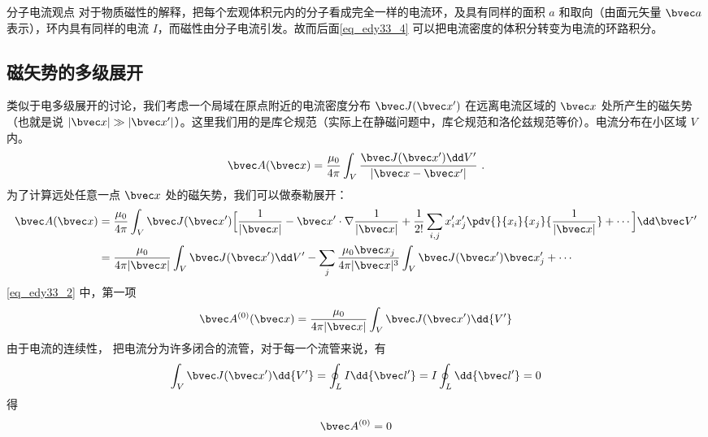
\begin{lemma}{分子电流观点}
对于物质磁性的解释，把每个宏观体积元内的分子看成完全一样的电流环，及具有同样的面积 $a$ 和取向（由面元矢量 $\bvec a$ 表示），环内具有同样的电流 $I$，而磁性由分子电流引发。故而后面\autoref{eq_edy33_4} 可以把电流密度的体积分转变为电流的环路积分。
\end{lemma}
\subsection{磁矢势的多级展开}
类似于电多级展开的讨论，我们考虑一个局域在原点附近的电流密度分布 $\bvec J(\bvec x')$ 在远离电流区域的 $\bvec x$ 处所产生的磁矢势（也就是说 $|\bvec x|\gg|\bvec x'|$）。这里我们用的是库仑规范（实际上在静磁问题中，库仑规范和洛伦兹规范等价）。电流分布在小区域 $V$ 内。
\begin{equation}
\bvec A(\bvec x)=\dfrac {\mu_0}{4\pi} \int_V \dfrac{ \bvec J(\bvec x^{\prime})\dd V^{\prime}}{|\bvec x - \bvec x'|}\label{eq_edy33_1}~.
\end{equation}
为了计算远处任意一点 $\bvec x$ 处的磁矢势，我们可以做泰勒展开：
\begin{equation}\label{eq_edy33_2}
\begin{aligned}
\bvec A(\bvec x)&=\dfrac {\mu_0}{4\pi}\int_V \bvec J(\bvec x')\Big[\dfrac{1}{|\bvec x|}-\bvec x'\cdot\nabla \dfrac{1}{|\bvec x|}+\dfrac{1}{2!}\sum_{i,j}x_i^{\prime}x_j^{\prime}\pdv{}{x_i}{x_j}{\dfrac 1 {|\bvec x|}}+\cdots\Big]\dd \bvec V^{\prime}
\\
&=\dfrac{\mu_0}{4\pi|\bvec x|}\int_V \bvec J(\bvec x')\dd V'
-\sum_{j}\dfrac{\mu_0 \bvec x_j}{4\pi |\bvec x|^3}\int_V \bvec J(\bvec x')\bvec x'_j + \cdots
\end{aligned}
\end{equation}
\autoref{eq_edy33_2} 中，第一项
\begin{equation}
\bvec A^{(0)}(\bvec x)=\dfrac {\mu_0}{4\pi |\bvec x|}\int_V \bvec J(\bvec x')\dd{ V^{\prime}}\label{eq_edy33_3}
\end{equation}
由于电流的连续性，%
把电流分为许多闭合的流管，对于每一个流管来说，有
\begin{equation}
\int_V \bvec J(\bvec x^{\prime}) \dd{V^{\prime}}=\oint_L I\dd{\bvec l'}=I\oint_L \dd{\bvec l'}=0\label{eq_edy33_4}
\end{equation}
得\begin{equation}
\bvec A^{(0)}=0\label{eq_edy33_5}
\end{equation}
